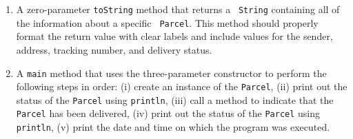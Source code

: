 \documentclass[12pt]{article}
\begin{document}
\begin{enumerate}
\begin{enumerate}
    \item A zero-parameter {\tt toString} method that returns a {\tt
      String} containing all of the information about a specific {\tt
      Parcel}.  This method should properly format the return value
      with clear labels and include values for the sender, address,
      tracking number, and delivery status.

    \item A {\tt main} method that uses the three-parameter
      constructor to perform the following steps in order: (i) create
      an instance of the {\tt Parcel}, (ii) print out the status of
      the {\tt Parcel} using {\tt println}, (iii) call a method to
      indicate that the {\tt Parcel} has been delivered, (iv) print
      out the status of the {\tt Parcel} using {\tt println}, (v)
      print the date and time on which the program was executed.

  \end{enumerate}

\end{enumerate}
\end{document}
